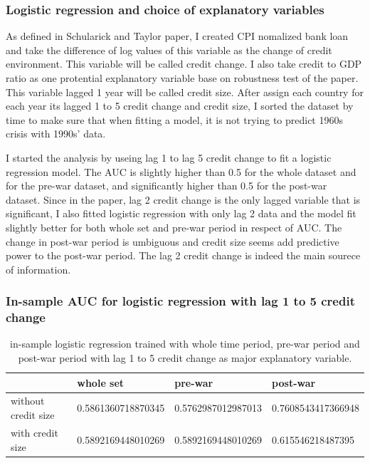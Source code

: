 \documentclass{article}
\begin{document}
\subsubsection*{Logistic regression and choice of explanatory variables}

As defined in Schularick and Taylor paper, I created CPI nomalized bank
loan and take the difference of log values of this variable as the change
of credit environment. This variable will be called credit change. I also
take credit to GDP ratio as one protential
explanatory variable base on robustness test of the paper. This variable
lagged 1 year will be called credit size. After
assign each country for each year its lagged 1 to 5 credit change and credit size, I
sorted the dataset by time to make sure that when fitting a model, it is
not trying to predict 1960s crisis with 1990s' data.

I started the analysis by useing lag 1 to lag 5 credit change to fit a
logistic regression model. The AUC is slightly higher than 0.5 for the whole
dataset and for the pre-war dataset, and significantly higher than 0.5
for the post-war dataset. Since in the paper, lag 2 credit change is the only
lagged variable that
is significant, I also fitted logistic regression with only lag 2 data
and the model fit slightly better for both whole set and pre-war period
in respect of AUC. The change in post-war period is umbiguous and 
credit size seems add predictive power to the post-war period. The lag 2 credit
change is indeed the
main sourece of information.

\subsubsection*{In-sample AUC for logistic regression with lag 1 to 5 credit change}

\begin{table}[H]
    \caption{in-sample logistic regression trained with whole time period,
    pre-war period and post-war period with lag 1 to 5 credit change as major
    explanatory variable.}
    \begin{center}\begin{tabular}{|l|l|l|l|}
    \hline
                        & whole set          & pre-war            & post-war           \\ \hline
    without credit size & 0.5861360718870345 & 0.5762987012987013 & 0.7608543417366948 \\ \hline
    with credit size    & 0.5892169448010269 & 0.5892169448010269 & 0.615546218487395 \\ \hline
    \end{tabular}\end{center}
\end{table}
\end{document}
